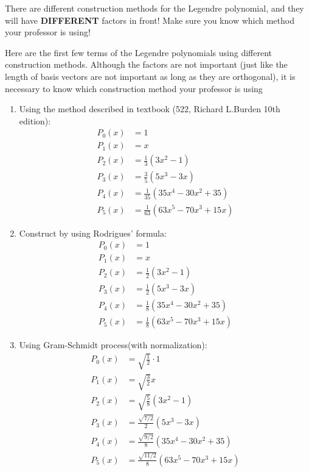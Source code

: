 \begin{warning}
	There are different construction methods for the Legendre polynomial, and they will have \textbf{DIFFERENT} factors in front! Make sure you know which method your professor is using!
\end{warning}
\begin{summary}
	Here are the first few terms of the Legendre polynomials using different construction methods. Although the factors are not important (just like the length of basis vectors are not important as long as they are orthogonal), it is necessary to know which construction method your professor is using 
	\begin{enumerate}
		\item 
		Using the method described in textbook (522, Richard L.Burden 10th edition):
		\begin{align*}
		P_0(x) &= 1\\
		P_1(x) &= x\\
		P_2(x) &= \frac{1}{3}(3x^2-1) \\
		P_3(x) &= \frac{3}{5}(5x^3 - 3x) \\
		P_4(x) &= \frac{1}{35}(35x^4 -30x^2 + 35)\\
		P_5(x) &= \frac{1}{63}(63x^5 - 70x^3 + 15x)
		\end{align*}
		
		\item 
		Construct by using Rodrigues' formula:
		\begin{align*}
		P_0(x) &= 1\\
		P_1(x) &= x\\
		P_2(x) &= \frac{1}{2}(3x^2-1) \\
		P_3(x) &= \frac{1}{2}(5x^3 - 3x) \\
		P_4(x) &= \frac{1}{8}(35x^4 -30x^2 + 35)\\
		P_5(x) &= \frac{1}{8}(63x^5 - 70x^3 + 15x)
		\end{align*}
		
		\item 
		Using Gram-Schmidt process(with normalization):
		\begin{align*}
		P_0(x) &= \sqrt{\frac{1}{2}}\cdot 1\\
		P_1(x) &= \sqrt{\frac{3}{2}}x\\
		P_2(x) &= \sqrt{\frac{5}{8}}(3x^2-1) \\
		P_3(x) &= \frac{\sqrt{7/2}}{2}(5x^3 - 3x) \\
		P_4(x) &= \frac{\sqrt{9/2}}{8}(35x^4 -30x^2 + 35)\\
		P_5(x) &= \frac{\sqrt{11/2}}{8}(63x^5 - 70x^3 + 15x)
		\end{align*}
	\end{enumerate}
\end{summary}

